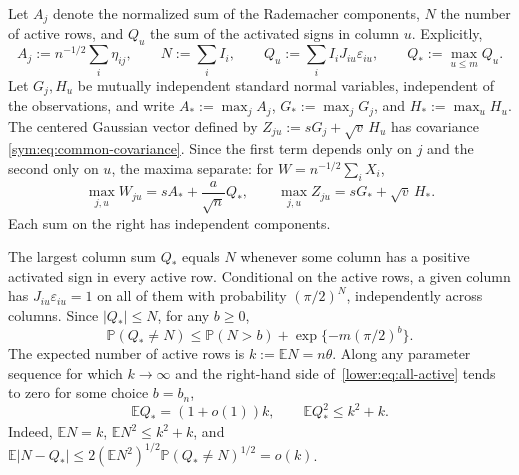 \documentclass[11pt,letterpaper]{article}
\theoremstyle{remark}
\newcommand{\E}{\mathbb E}
\newcommand{\Pp}{\mathbb P}
\begin{document}
Let \(A_j\) denote the normalized sum of the Rademacher components,
\(N\) the number of active rows, and \(Q_u\) the sum of the
activated signs in column \(u\). Explicitly,
\[
 A_j:=n^{-1/2}\sum_i\eta_{ij},\qquad
 N:=\sum_iI_i,\qquad Q_u:=\sum_iI_iJ_{iu}\varepsilon_{iu},
 \qquad Q_*:=\max_{u\le m}Q_u.
\]
Let \(G_j,H_u\) be mutually independent standard normal variables,
independent of the observations, and write
\(A_*:=\max_jA_j\), \(G_*:=\max_jG_j\), and \(H_*:=\max_uH_u\).
The centered Gaussian vector defined by
\(Z_{ju}:=sG_j+\sqrt v\,H_u\) has covariance
\eqref{sym:eq:common-covariance}. Since the first term depends only
on \(j\) and the second only on \(u\), the maxima separate:
for \(W=n^{-1/2}\sum_iX_i\),
\begin{equation}
 \max_{j,u}W_{ju}=sA_*+\frac a{\sqrt n}Q_*,
 \qquad \max_{j,u}Z_{ju}=sG_*+\sqrt v\,H_*.
 \label{sym:eq:common-maxima}
\end{equation}
Each sum on the right has independent components.

The largest column sum \(Q_*\) equals \(N\) whenever some column
has a positive activated sign in every active row.
Conditional on the active rows, a given column has
\(J_{iu}\varepsilon_{iu}=1\) on all of them with probability
\((\pi/2)^N\), independently across columns. Since \(|Q_*|\le N\),
for any \(b\ge0\),
\begin{equation}
 \Pp(Q_*\ne N)\le \Pp(N>b)+\exp\{-m(\pi/2)^b\}.
 \label{lower:eq:all-active}
\end{equation}
The expected number of active rows is \(k:=\E N=n\theta\).
Along any parameter sequence for which \(k\to\infty\) and the
right-hand side of~\eqref{lower:eq:all-active} tends to zero for
some choice \(b=b_n\),
\begin{equation}
 \E Q_*=(1+o(1))k,\qquad \E Q_*^2\le k^2+k.
 \label{lower:eq:activation-moments}
\end{equation}
Indeed, \(\E N=k\), \(\E N^2\le k^2+k\), and
\(\E|N-Q_*|\le2(\E N^2)^{1/2}\Pp(Q_*\ne N)^{1/2}=o(k)\).
\end{document}
